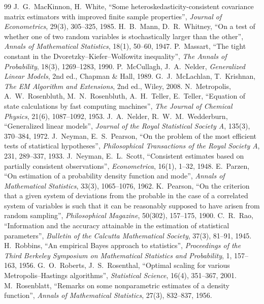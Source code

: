 \documentclass[main.tex]{subfiles}
\begin{document}
\begin{thebibliography}{99}
 J.~G.~MacKinnon, H.~White, ``Some heteroskedasticity-consistent covariance matrix estimators with improved finite sample properties'', \emph{Journal of Econometrics}, 29(3), 305--325, 1985.
 H.~B.~Mann, D.~R.~Whitney, ``On a test of whether one of two random variables is stochastically larger than the other'', \emph{Annals of Mathematical Statistics}, 18(1), 50--60, 1947.
 P.~Massart, ``The tight constant in the Dvoretzky--Kiefer--Wolfowitz inequality'', \emph{The Annals of Probability}, 18(3), 1269--1283, 1990.
 P.~McCullagh, J.~A.~Nelder, \emph{Generalized Linear Models}, 2nd ed., Chapman \& Hall, 1989.
 G.~J.~McLachlan, T.~Krishnan, \emph{The EM Algorithm and Extensions}, 2nd ed., Wiley, 2008.
 N.~Metropolis, A.~W.~Rosenbluth, M.~N.~Rosenbluth, A.~H.~Teller, E.~Teller, ``Equation of state calculations by fast computing machines'', \emph{The Journal of Chemical Physics}, 21(6), 1087--1092, 1953.
 J.~A.~Nelder, R.~W.~M.~Wedderburn, ``Generalized linear models'', \emph{Journal of the Royal Statistical Society A}, 135(3), 370--384, 1972.
 J.~Neyman, E.~S.~Pearson, ``On the problem of the most efficient tests of statistical hypotheses'', \emph{Philosophical Transactions of the Royal Society A}, 231, 289--337, 1933.
 J.~Neyman, E.~L.~Scott, ``Consistent estimates based on partially consistent observations'', \emph{Econometrica}, 16(1), 1--32, 1948.
 E.~Parzen, ``On estimation of a probability density function and mode'', \emph{Annals of Mathematical Statistics}, 33(3), 1065--1076, 1962.
 K.~Pearson, ``On the criterion that a given system of deviations from the probable in the case of a correlated system of variables is such that it can be reasonably supposed to have arisen from random sampling'', \emph{Philosophical Magazine}, 50(302), 157--175, 1900.
 C.~R.~Rao, ``Information and the accuracy attainable in the estimation of statistical parameters'', \emph{Bulletin of the Calcutta Mathematical Society}, 37(3), 81--91, 1945.
 H.~Robbins, ``An empirical Bayes approach to statistics'', \emph{Proceedings of the Third Berkeley Symposium on Mathematical Statistics and Probability}, 1, 157--163, 1956.
 G.~O.~Roberts, J.~S.~Rosenthal, ``Optimal scaling for various Metropolis--Hastings algorithms'', \emph{Statistical Science}, 16(4), 351--367, 2001.
 M.~Rosenblatt, ``Remarks on some nonparametric estimates of a density function'', \emph{Annals of Mathematical Statistics}, 27(3), 832--837, 1956.

\end{thebibliography}
\end{document}
